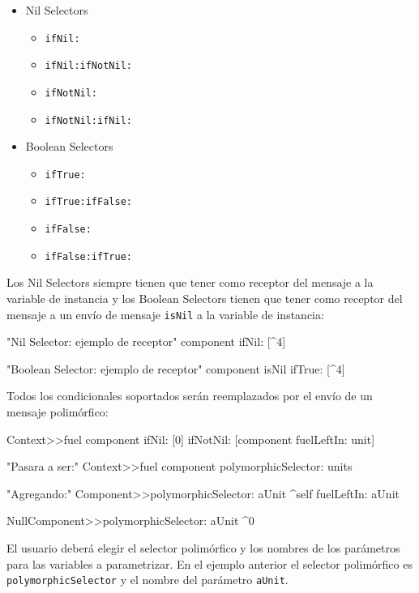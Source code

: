 \begin{itemize}
    \item Nil Selectors
    \begin{itemize}
        \item \lstinline{ifNil:}
        \item \lstinline{ifNil:ifNotNil:}
        \item \lstinline{ifNotNil:}
        \item \lstinline{ifNotNil:ifNil:}
    \end{itemize}

    \item Boolean Selectors
    \begin{itemize}
        \item \lstinline{ifTrue:}
        \item \lstinline{ifTrue:ifFalse:}
        \item \lstinline{ifFalse:}
        \item \lstinline{ifFalse:ifTrue:}
    \end{itemize}
\end{itemize}

Los Nil Selectors siempre tienen que tener como receptor del mensaje a la variable de instancia y los
Boolean Selectors tienen que tener como receptor del mensaje a un envío de mensaje \lstinline{isNil} a la
variable de instancia:

\begin{code}
"Nil Selector: ejemplo de receptor"
component ifNil: [^4]    

"Boolean Selector: ejemplo de receptor"
component isNil ifTrue: [^4]    
\end{code}

Todos los condicionales soportados serán reemplazados por el envío de un mensaje polimórfico:

\begin{code}
Context>>fuel
    component ifNil: [0] ifNotNil: [component fuelLeftIn: unit]

"Pasara a ser:"
Context>>fuel
    component polymorphicSelector: units

"Agregando:"
Component>>polymorphicSelector: aUnit
    ^self fuelLeftIn: aUnit

NullComponent>>polymorphicSelector: aUnit
    ^0
\end{code}

El usuario deberá elegir el selector polimórfico y los nombres de los parámetros para las variables
a parametrizar. En el ejemplo anterior el selector polimórfico es \lstinline{polymorphicSelector} y
el nombre del parámetro \lstinline{aUnit}.

